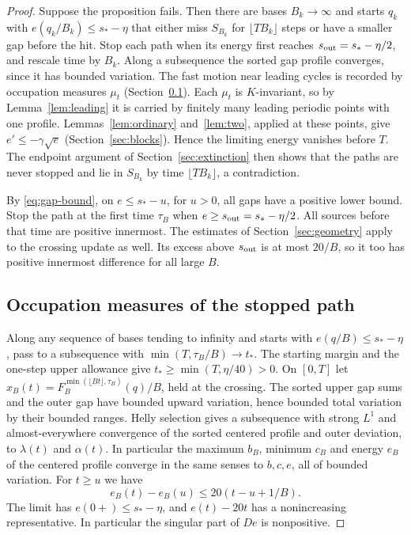\documentclass[11pt,reqno]{amsart}
\theoremstyle{remark}
\begin{document}
\begin{proof}
Suppose the proposition fails. Then there are bases \(B_k\to\infty\) and starts \(q_k\) with \(e(q_k/B_k)\le s_*-\eta\) that either miss \(S_{B_k}\) for \(\lfloor TB_k\rfloor\) steps or have a smaller gap before the hit. Stop each path when its energy first reaches \(s_{\rm out}=s_*-\eta/2\), and rescale time by \(B_k\). Along a subsequence the sorted gap profile converges, since it has bounded variation. The fast motion near leading cycles is recorded by occupation measures \(\mu_t\) (Section~\ref{sec:occupation}). Each \(\mu_t\) is \(K\)-invariant, so by Lemma~\ref{lem:leading} it is carried by finitely many leading periodic points with one profile. Lemmas~\ref{lem:ordinary} and~\ref{lem:two}, applied at these points, give \(e'\le-\gamma\sqrt e\) (Section~\ref{sec:blocks}). Hence the limiting energy vanishes before \(T\). The endpoint argument of Section~\ref{sec:extinction} then shows that the paths are never stopped and lie in \(S_{B_k}\) by time \(\lfloor TB_k\rfloor\), a contradiction.

By \eqref{eq:gap-bound}, on \(e\le s_*-u\), for \(u>0\), all gaps have a positive lower bound. Stop the path at the first time \(\tau_B\) when \(e\ge s_{\rm out}=s_*-\eta/2\). All sources before that time are positive innermost. The estimates of Section~\ref{sec:geometry} apply to the crossing update as well. Its excess above \(s_{\rm out}\) is at most \(20/B\), so it too has positive innermost difference for all large \(B\).

\subsection{Occupation measures of the stopped path}\label{sec:occupation}
Along any sequence of bases tending to infinity and starts with \(e(q/B)\le s_*-\eta\), pass to a subsequence with \(\min(T,\tau_B/B)\to t_*\). The starting margin and the one-step upper allowance give \(t_*\ge\min(T,\eta/40)>0\). On \([0,T]\) let \(x_B(t)=F_B^{\min(\lfloor Bt\rfloor,\tau_B)}(q)/B\), held at the crossing. The sorted upper gap sums and the outer gap have bounded upward variation, hence bounded total variation by their bounded ranges. Helly selection gives a subsequence with strong \(L^1\) and almost-everywhere convergence of the sorted centered profile and outer deviation, to \(\lambda(t)\) and \(\alpha(t)\). In particular the maximum \(b_B\), minimum \(c_B\) and energy \(e_B\) of the centered profile converge in the same senses to \(b,c,e\), all of bounded variation. For \(t\ge u\) we have
\begin{equation}\label{eq:upper-energy}
 e_B(t)-e_B(u)\le20(t-u+1/B).
\end{equation}
The limit has \(e(0+)\le s_*-\eta\), and \(e(t)-20t\) has a nonincreasing representative. In particular the singular part of \(De\) is nonpositive.


\end{proof}
\end{document}
